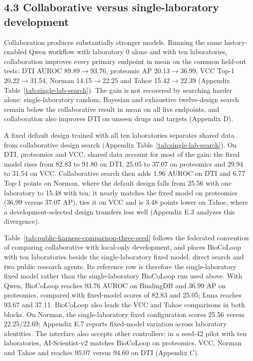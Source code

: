 \subsection*{4.3 Collaborative versus single-laboratory development}
Collaboration produces substantially stronger models. Running the same history-enabled Qwen workflow with laboratory 0 alone and with ten laboratories, collaboration improves every primary endpoint in mean on the common held-out tests: DTI AUROC 89.89$\rightarrow$93.76, proteomic AP 20.13$\rightarrow$36.99, VCC Top-1 20.22$\rightarrow$31.54, Norman 14.15$\rightarrow$22.25 and Tahoe 15.42$\rightarrow$22.39 (Appendix Table~\ref{tab:single-lab-search}). The gain is not recovered by searching harder alone: single-laboratory random, Bayesian and exhaustive twelve-design search remain below the collaborative result in mean on all five endpoints, and collaboration also improves DTI on unseen drugs and targets (Appendix D).

A fixed default design trained with all ten laboratories separates shared data from collaborative design search (Appendix Table~\ref{tab:single-lab-search}). On DTI, proteomics and VCC, shared data account for most of the gain: the fixed model rises from 82.83 to 91.80 on DTI, 25.05 to 37.07 on proteomics and 29.94 to 31.54 on VCC. Collaborative search then adds 1.96 AUROC on DTI and 6.77 Top-1 points on Norman, where the default design falls from 25.56 with one laboratory to 15.48 with ten; it nearly matches the fixed model on proteomics (36.99 versus 37.07 AP), ties it on VCC and is 3.48 points lower on Tahoe, where a development-selected design transfers less well (Appendix E.3 analyzes this divergence).


Table~\ref{tab:public-harness-comparison-three-seed} follows the federated convention of comparing collaborative with local-only development, and places BioCoLoop with ten laboratories beside the single-laboratory fixed model, direct search and two public research agents. Its reference row is therefore the single-laboratory fixed model rather than the single-laboratory BioCoLoop run used above. With Qwen, BioCoLoop reaches 93.76 AUROC on BindingDB and 36.99 AP on proteomics, compared with fixed-model scores of 82.83 and 25.05; Luna reaches 93.67 and 37.11. BioCoLoop also leads the VCC and Tahoe comparisons in both blocks. On Norman, the single-laboratory fixed configuration scores 25.56 versus 22.25/22.69; Appendix E.7 reports fixed-model variation across laboratory identities. The interface also accepts other controllers: in a seed-42 pilot with ten laboratories, AI-Scientist-v2 matches BioCoLoop on proteomics, VCC, Norman and Tahoe and reaches 95.07 versus 94.60 on DTI (Appendix C).

